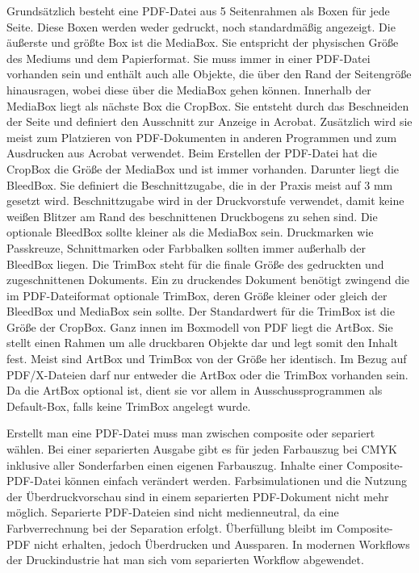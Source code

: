 \par
Grundsätzlich besteht eine PDF-Datei aus 5 Seitenrahmen als Boxen für jede Seite. Diese Boxen werden weder gedruckt, noch standardmäßig angezeigt. Die äußerste und größte Box ist die MediaBox. Sie entspricht der physischen Größe des Mediums und dem Papierformat. Sie muss immer in einer PDF-Datei vorhanden sein und enthält auch alle Objekte, die über den Rand der Seitengröße hinausragen, wobei diese über die MediaBox gehen können. Innerhalb der MediaBox liegt als nächste Box die CropBox. Sie entsteht durch das Beschneiden der Seite und definiert den Ausschnitt zur Anzeige in Acrobat. Zusätzlich wird sie meist zum Platzieren von PDF-Dokumenten in anderen Programmen und zum Ausdrucken aus Acrobat verwendet. Beim Erstellen der PDF-Datei hat die CropBox die Größe der MediaBox und ist immer vorhanden. Darunter liegt die BleedBox. Sie definiert die Beschnittzugabe, die in der Praxis meist auf 3 mm gesetzt wird. Beschnittzugabe wird in der Druckvorstufe verwendet, damit keine weißen Blitzer am Rand des beschnittenen Druckbogens zu sehen sind. Die optionale BleedBox sollte kleiner als die MediaBox sein. Druckmarken wie Passkreuze, Schnittmarken oder Farbbalken sollten immer außerhalb der BleedBox liegen. Die TrimBox steht für die finale Größe des gedruckten und zugeschnittenen Dokuments. Ein zu druckendes Dokument benötigt zwingend die im PDF-Dateiformat optionale TrimBox, deren Größe kleiner oder gleich der BleedBox und MediaBox sein sollte. Der Standardwert für die TrimBox ist die Größe der CropBox. Ganz innen im Boxmodell von PDF liegt die ArtBox. Sie stellt einen Rahmen um alle druckbaren Objekte dar und legt somit den Inhalt fest. Meist sind ArtBox und TrimBox von der Größe her identisch. Im Bezug auf PDF/X-Dateien darf nur entweder die ArtBox oder die TrimBox vorhanden sein. Da die ArtBox optional ist, dient sie vor allem in Ausschussprogrammen als Default-Box, falls keine TrimBox angelegt wurde. 
\par
Erstellt man eine PDF-Datei muss man zwischen composite oder separiert wählen. Bei einer separierten Ausgabe gibt es für jeden Farbauszug bei CMYK inklusive aller Sonderfarben einen eigenen Farbauszug. Inhalte einer Composite-PDF-Datei können einfach verändert werden. Farbsimulationen und die Nutzung der Überdruckvorschau sind in einem separierten PDF-Dokument nicht mehr möglich. Separierte PDF-Dateien sind nicht medienneutral, da eine Farbverrechnung bei der Separation erfolgt. Überfüllung bleibt im Composite-PDF nicht erhalten, jedoch Überdrucken und Aussparen. In modernen Workflows der Druckindustrie hat man sich vom separierten Workflow abgewendet. \cite{schneeberger}
